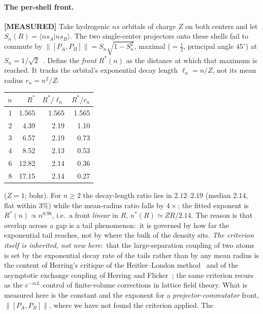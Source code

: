 \documentclass[aps,pra,twocolumn,superscriptaddress,longbibliography]{revtex4-2}
\newcommand{\gvq}[2]{#2}
\begin{document}
\paragraph{The per-shell front.}
\textbf{[MEASURED]} Take hydrogenic $ns$ orbitals of charge $Z$ on both
centers and let $S_n(R) = \langle ns_A | ns_B \rangle$.  The two
single-center projectors onto these shells fail to commute by
$\|[P_A, P_B]\| = S_n\sqrt{1 - S_n^2}$, maximal ($= \tfrac12$, principal
angle $45^\circ$) at $S_n = 1/\sqrt2$~\cite{halmos1969,bottcher_spitkovsky2010}.  Define the \emph{front}
$R^{*}(n)$ as the distance at which that maximum is reached.  It tracks the
orbital's exponential decay length $\ell_n = n/Z$, not its mean radius
$r_n = n^2/Z$:
\begin{center}
\begin{tabular}{r@{\quad}r@{\quad}r@{\quad}r}
$n$ & $R^{*}$ & $R^{*}/\ell_n$ & $R^{*}/r_n$ \\
\hline
1 & 1.565 & 1.565 & 1.565 \\
2 & 4.39 & 2.19 & 1.10 \\
3 & 6.57 & 2.19 & 0.73 \\
4 & 8.52 & 2.13 & 0.53 \\
6 & 12.82 & 2.14 & 0.36 \\
8 & 17.15 & 2.14 & 0.27 \\
\end{tabular}
\end{center}
($Z = 1$; bohr).  For $n \ge 2$ the decay-length ratio lies in
$2.12$--$2.19$ (median $\gvq{decomp_front_ratio}{2.14}$, flat within
$3\%$) while the mean-radius
ratio falls by $4\times$; the fitted exponent is
$R^{*}(n) \propto n^{\gvq{decomp_front_exponent}{0.98}}$, i.e.\ a front
\emph{linear} in $R$, $n^{*}(R) \simeq Z R/2.14$.  The reason is that
overlap across a gap is a tail phenomenon:\ it is governed by how far the
exponential tail reaches, not by where the bulk of the density sits.
\emph{The criterion itself is inherited, not new here}:\ that the
large-separation coupling of two atoms is set by the exponential decay rate
of the tails rather than by any mean radius is the content of Herring's
critique of the Heitler--London method~\cite{herring1962} and of the
asymptotic exchange coupling of Herring and Flicker~\cite{herring_flicker1964};
the same criterion recurs as the $e^{-m L}$ control of finite-volume
corrections in lattice field theory.  What is measured here is the
constant and the exponent for a \emph{projector-commutator} front,
$\|[P_A, P_B]\|$, where we have not found the criterion applied.  The
\end{document}
